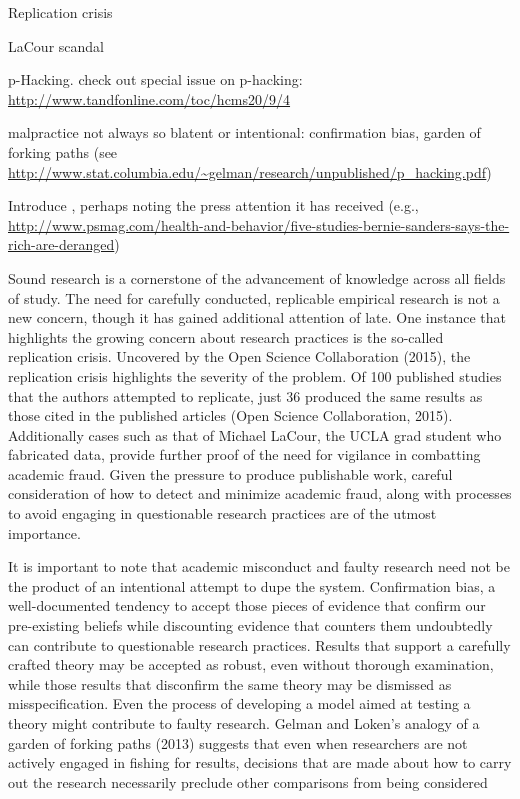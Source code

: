 
Replication crisis

LaCour scandal

p-Hacking.  check out special issue on p-hacking: \url{http://www.tandfonline.com/toc/hcms20/9/4}

malpractice not always so blatent or intentional: confirmation bias, garden of forking paths (see \url{http://www.stat.columbia.edu/~gelman/research/unpublished/p_hacking.pdf})

Introduce \citet{Newman2015}, perhaps noting the press attention it has received (e.g., \url{http://www.psmag.com/health-and-behavior/five-studies-bernie-sanders-says-the-rich-are-deranged})

Sound research is a cornerstone of the advancement of knowledge across all fields of study. The need for carefully conducted, replicable empirical research is not a new concern, though it has gained additional attention of late. One instance that highlights the growing concern about research practices is the so-called replication crisis. Uncovered by the Open Science Collaboration (2015), the replication crisis highlights the severity of the problem. Of 100 published studies that the authors attempted to replicate, just 36 produced the same results as those cited in the published articles (Open Science Collaboration, 2015). Additionally cases such as that of Michael LaCour, the UCLA grad student who fabricated data, provide further proof of the need for vigilance in combatting academic fraud. Given the pressure to produce publishable work, careful consideration of how to detect and minimize academic fraud, along with processes to avoid engaging in questionable research practices are of the utmost importance.

It is important to note that academic misconduct and faulty research need not be the product of an intentional attempt to dupe the system. Confirmation bias, a well-documented tendency to accept those pieces of evidence that confirm our pre-existing beliefs while discounting evidence that counters them undoubtedly can contribute to questionable research practices. Results that support a carefully crafted theory may be accepted as robust, even without thorough examination, while those results that disconfirm the same theory may be dismissed as misspecification. Even the process of developing a model aimed at testing a theory might contribute to faulty research. Gelman and Loken’s analogy of a garden of forking paths (2013) suggests that even when researchers are not actively engaged in fishing for results, decisions that are made about how to carry out the research necessarily preclude other comparisons from being considered

